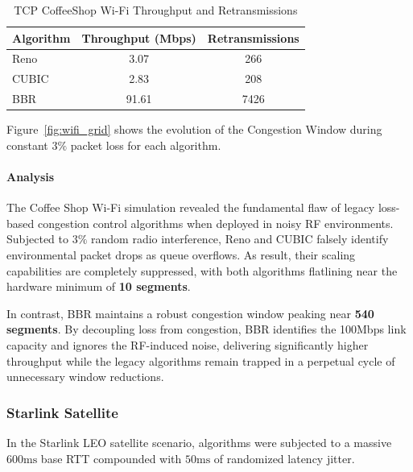 \documentclass[12pt,a4paper]{article}
\begin{document}
\begin{table}[H]
\centering
\caption{TCP CoffeeShop Wi-Fi Throughput and Retransmissions}
\label{tab:tcp_coffeeshop_summary}
\begin{tabular}{|l|c|c|}
\hline
\textbf{Algorithm} & \textbf{Throughput (Mbps)} & \textbf{Retransmissions} \\
\hline
Reno  & 3.07 & 266 \\
CUBIC & 2.83 & 208 \\
BBR   & 91.61 & 7426 \\
\hline
\end{tabular}
\end{table}

Figure~\ref{fig:wifi_grid} shows the evolution of the Congestion Window during constant $3\%$ packet loss for each algorithm.



\paragraph{Analysis}
The Coffee Shop Wi-Fi simulation revealed the fundamental flaw of legacy loss-based congestion control algorithms when deployed in noisy RF environments. Subjected to $3\%$ random radio interference, Reno and CUBIC falsely identify environmental packet drops as queue overflows. As result, their scaling capabilities are completely suppressed, with both algorithms flatlining near the hardware minimum of \textbf{10 segments}.

In contrast, BBR maintains a robust congestion window peaking near \textbf{540 segments}. By decoupling loss from congestion, BBR identifies the 100Mbps link capacity and ignores the RF-induced noise, delivering significantly higher throughput while the legacy algorithms remain trapped in a perpetual cycle of unnecessary window reductions.

\subsubsection{Starlink Satellite}
In the Starlink LEO satellite scenario, algorithms were subjected to a massive $600\text{ms}$ base RTT compounded with $50\text{ms}$ of randomized latency jitter. 
\end{document}
